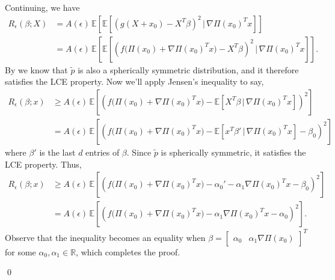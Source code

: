 \documentclass[11pt]{article}
\begin{document}
Continuing, we have
\begin{align*}
    R_{\epsilon}(\beta; X)&= A(\epsilon)\,\mathbb{E}\left[\mathbb{E}\left[\left(g(X+x_0)-X^{T}\beta\right)^2 \, \Big| 
    \, \nabla\Pi(x_0)^{T}x\right]\right]\\
    &= A(\epsilon)\,\mathbb{E}\left[\mathbb{E}\left[\left(f\Big(\Pi(x_0) + \nabla\Pi(x_0)^{T}x\Big)-X^{T}\beta\right)^2 \, \Big| 
    \, \nabla\Pi(x_0)^{T}x\right]\right].
\end{align*}
By  we know that $\tilde{p}$ is also a spherically symmetric distribution, and it therefore satisfies the LCE property. Now we'll apply Jensen's inequality to say,
\begin{align*}
    R_{\epsilon}(\beta; x) &\geq A( \epsilon)\,\mathbb{E}\left[\left(f\Big(\Pi(x_0) + \nabla\Pi(x_0)^{T}x\Big)-\mathbb{E}\left[X^{T}\beta \, \Big| 
    \, \nabla\Pi(x_0)^{T}x\right]\right)^2\right] \\
    &= A( \epsilon)\,\mathbb{E}\left[\left(f\Big(\Pi(x_0) + \nabla\Pi(x_0)^{T}x\Big)-\mathbb{E}\left[x^{T}\beta' \, \Big| 
    \, \nabla\Pi(x_0)^{T}x\right]- \beta_0\right)^2\right]
\end{align*}
where $\beta'$ is the last $d$ entries of $\beta$.  Since $\tilde{p}$ is spherically symmetric, it satisfies the LCE property. Thus,
\begin{align}
    R_{\epsilon}(\beta; x) &\geq A( \epsilon)\,\mathbb{E}\left[\left(f\Big(\Pi(x_0) + \nabla\Pi(x_0)^{T}x\Big)-\alpha_0' - \alpha_1\nabla\Pi(x_0)^{T}x - \beta_0\right)^2\right] \\
    &=  A( \epsilon)\,\mathbb{E}\left[\left(f\Big(\Pi(x_0) + \nabla\Pi(x_0)^{T}x\Big) - \alpha_1\nabla\Pi(x_0)^{T}x - \alpha_0\right)^2\right]. \label{eq: surrogate risk lower bound}
\end{align}
Observe that the inequality becomes an equality when $\beta = \begin{bmatrix}\alpha_0  & \alpha_1\nabla \Pi(x_0) \end{bmatrix}^T$ for some $\alpha_0, \alpha_1 \in \mathbb{R}$, which completes the proof.

\qed{}
\end{document}
